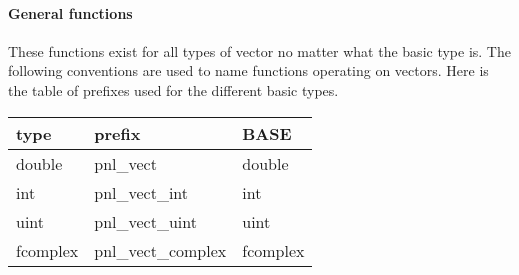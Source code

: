 \paragraph{General functions}
These functions exist for all types of vector no matter what the basic type
is. The following conventions are used to name functions operating on vectors.
Here is the table of prefixes used for the different basic types.

\begin{center}
  \begin{tabular}[t]{lll}
    type & prefix & BASE\\
    \hline
    double & pnl_vect & double \\
    \hline
    int & pnl_vect_int & int \\
    \hline
    uint & pnl_vect_uint & uint\\
    \hline
    fcomplex & pnl_vect_complex & fcomplex
  \end{tabular}
\end{center}

